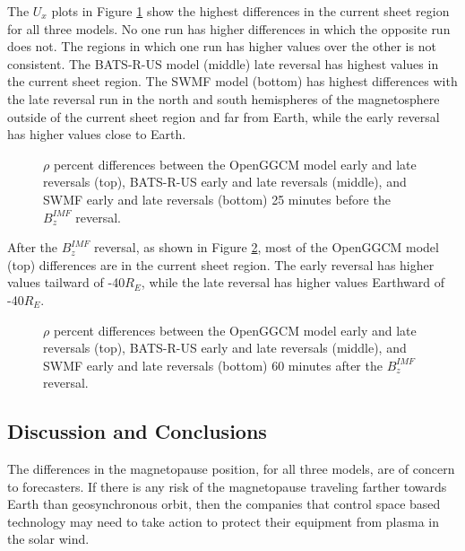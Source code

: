 The $U_x$ plots in Figure \ref{fig:UxdiffPCBeforeFlip} show the highest
differences in the current sheet region for all three models.
No one run has higher differences in which the opposite run does
not. The regions in which one run has higher values over the other is not
consistent. The BATS-R-US model (middle) late reversal has highest values in the
current sheet region. The SWMF model (bottom) has highest differences with the
late reversal run in the north and south hemispheres of the magnetosphere outside of
the current sheet region and far from Earth, while the early reversal has higher values
close to Earth.
\begin{figure}
	\centering
	\caption{$\rho$ percent differences between the OpenGGCM model early and late
	reversals (top), BATS-R-US early and late reversals (middle), and SWMF early
	and late reversals (bottom) 25 minutes before the $B_z^{IMF}$ reversal.}
	\figSpace
	\label{fig:UxdiffPCBeforeFlip}
\end{figure}

After the $B_z^{IMF}$ reversal, as shown in Figure \ref{fig:UxdiffPCAfterFlip}, most
of the OpenGGCM model (top) differences are in the current sheet region. The early
reversal has higher values tailward of -40$R_E$, while the late reversal has higher
values Earthward of -40$R_E$.
\begin{figure}
	\centering
	\caption{$\rho$ percent differences between the OpenGGCM model early and late
	reversals (top), BATS-R-US early and late reversals (middle), and SWMF early
	and late reversals (bottom) 60 minutes after the $B_z^{IMF}$ reversal.}
	\figSpace
	\label{fig:UxdiffPCAfterFlip}
\end{figure}

\subsection{Discussion and Conclusions}
The differences in the magnetopause position, for
all three models, are of concern to forecasters. If there is any risk of
the magnetopause traveling farther towards Earth than geosynchronous orbit, then the companies
that control space based technology may need to take action to protect their
equipment from plasma in the solar wind.

